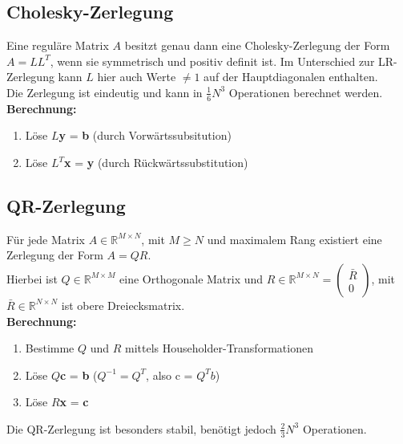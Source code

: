\documentclass[a4paper, 14pt]{article}
\begin{document}
    \subsection{Cholesky-Zerlegung}
    Eine regul\"are Matrix $A$ besitzt genau dann eine Cholesky-Zerlegung der Form $A = LL^T$, wenn sie symmetrisch und
    positiv definit ist. Im Unterschied zur LR-Zerlegung kann $L$ hier auch Werte $\neq 1$ auf der Hauptdiagonalen
    enthalten.\\
    \newline
    Die Zerlegung ist eindeutig und kann in $\frac{1}{6}N^3$ Operationen berechnet werden.\\
    \newline
    \textbf{Berechnung:}
    \begin{enumerate}
        \item L\"ose $L$\textbf{y} = \textbf{b} (durch Vorw\"artssubsitution)
        \item L\"ose $L^T$\textbf{x} = \textbf{y} (durch R\"uckw\"artssubstitution)
    \end{enumerate}

    \subsection{QR-Zerlegung}
    F\"ur jede Matrix $A\in\mathds{R}^{M\times N}$, mit $M \geq N$ und maximalem Rang existiert eine Zerlegung der Form
    $A = QR$.\\
    Hierbei ist $Q\in\mathds{R}^{M\times M}$ eine Orthogonale Matrix und
    $R\in\mathds{R}^{M\times N} = \begin{pmatrix}\bar{R}\\0\end{pmatrix}$, mit $\bar{R}\in\mathds{R}^{N\times N}$ ist
    obere Dreiecksmatrix.\\
    \newline
    \textbf{Berechnung:}
    \begin{enumerate}
        \item Bestimme $Q$ und $R$ mittels Householder-Transformationen
        \item L\"ose $Q$\textbf{c} = \textbf{b} ($Q^{-1} = Q^T$, also c = $Q^Tb$)
        \item L\"ose $R$\textbf{x} = \textbf{c}
    \end{enumerate}
    Die QR-Zerlegung ist besonders stabil, ben\"otigt jedoch $\frac{2}{3}N^3$ Operationen.
\end{document}
